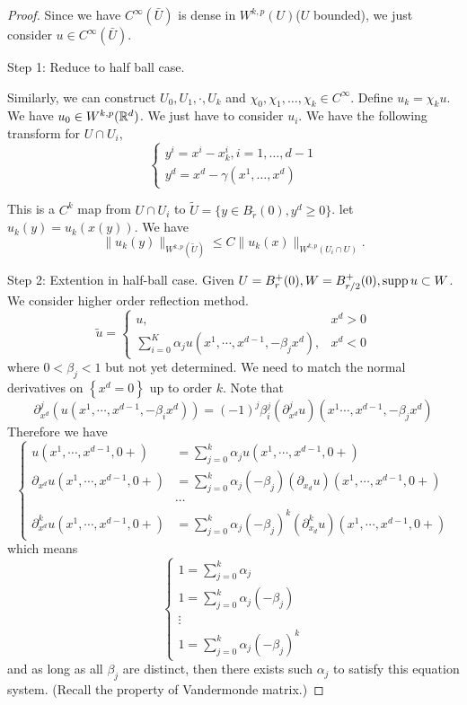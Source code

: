 \begin{proof}
Since we have $C^\infty(\bar U)$ is dense in $W^{k,p}(U)$($U$ bounded), we just consider $u\in C^\infty( \bar U)$.

Step 1: Reduce to half ball case. 

Similarly, we can construct $U_0, U_1, \cdot, U_k$ and $\chi_0, \chi_1, \dots, \chi_k \in C^\infty$. Define $u_k = \chi_k u$. We have $u_0 \in W^{k,p}(\mathbb{R}^d)$. We just have to consider $u_i$. We have the following transform for $U \cap U_i$, 
\[
    \begin{cases}
        y^i = x^i - x_k^i, i= 1,\dots, d-1 \\ 
        y^d = x^d - \gamma(x^1, \dots, x^d)
    \end{cases}    
\]

This is a $C^k$ map from $U\cap U_i$ to $\tilde U = \{y\in B_{\tilde r}(0), y^d \ge 0\}$. let $u_k(y) = u_k(x(y))$. We have 
\[
    \|u_k(y)\|_{W^{k,p}(\tilde U)} \le C\|u_k(x)\|_{W^{k,p}(U_i\cap U)}. 
\]

Step 2: Extention in half-ball case. Given $U = B_r^+(0), W=B_{r/2}^+(0), \operatorname{{\rm supp}} u\subset  W$. We consider higher order reflection method. 
$$
\tilde{u}=\left\{\begin{array}{rr}
u, & x^{d}>0 \\
\sum_{i=0}^{K} \alpha_{j} u\left(x^{1}, \cdots, x^{d-1},-\beta_{j} x^{d}\right), & x^{d}<0
\end{array}\right.
$$
where $0<\beta_{j}<1$ but not yet determined. We need to match the normal derivatives on $\left\{x^{d}=0\right\}$ up to order $k$. Note that
$$
\partial_{x^{d}}^{j}\left(u\left(x^{1}, \cdots, x^{d-1},-\beta_{i} x^{d}\right)\right)=(-1)^{j} \beta_{i}^{j}\left(\partial_{x^{d}}^{j} u\right)\left(x^{1} \cdots, x^{d-1},-\beta_{j} x^{d}\right)
$$
Therefore we have
$$
\left\{\begin{aligned}
u\left(x^{1}, \cdots, x^{d-1}, 0+\right) &=\sum_{j=0}^{k} \alpha_{j} u\left(x^{1}, \cdots, x^{d-1}, 0+\right) \\
\partial_{x^{d}} u\left(x^{1}, \cdots, x^{d-1}, 0+\right) &=\sum_{j=0}^{k} \alpha_{j}\left(-\beta_{j}\right)\left(\partial_{x_{d}} u\right)\left(x^{1}, \cdots, x^{d-1}, 0+\right) \\
& \cdots \\
\partial_{x^{d}}^{k} u\left(x^{1}, \cdots, x^{d-1}, 0+\right) &=\sum_{j=0}^{k} \alpha_{j}\left(-\beta_{j}\right)^{k}\left(\partial_{x_{d}}^{k} u\right)\left(x^{1}, \cdots, x^{d-1}, 0+\right)
\end{aligned}\right.
$$
which means
$$
\left\{\begin{array}{l}
1=\sum_{j=0}^{k} \alpha_{j} \\
1=\sum_{j=0}^{k} \alpha_{j}\left(-\beta_{j}\right) \\
\vdots \\
1=\sum_{j=0}^{k} \alpha_{j}\left(-\beta_{j}\right)^{k}
\end{array}\right.
$$
and as long as all $\beta_{j}$ are distinct, then there exists such $\alpha_{j}$ to satisfy this equation system. (Recall the property of Vandermonde matrix.)


\end{proof}
